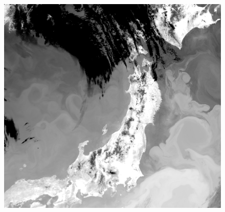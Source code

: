 \begin{itemize}
\begin{figure}[hbtp]
\begin{minipage}[t]{\hsize}
      \includegraphics[scale = 0.2]{d850429avhrr4.bmp}
    \end{minipage}
  \end{figure}
\end{itemize} 
\clearpage

